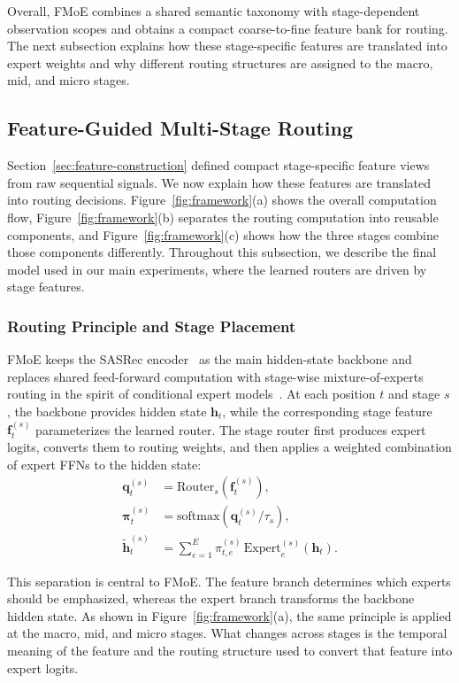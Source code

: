 \documentclass[sigconf,anonymous,review]{acmart}
\begin{document}
Overall, FMoE combines a shared semantic taxonomy with stage-dependent observation scopes and obtains a compact coarse-to-fine feature bank for routing. The next subsection explains how these stage-specific features are translated into expert weights and why different routing structures are assigned to the macro, mid, and micro stages.

\subsection{Feature-Guided Multi-Stage Routing}

Section~\ref{sec:feature-construction} defined compact stage-specific feature views from raw sequential signals. We now explain how these features are translated into routing decisions. Figure~\ref{fig:framework}(a) shows the overall computation flow, Figure~\ref{fig:framework}(b) separates the routing computation into reusable components, and Figure~\ref{fig:framework}(c) shows how the three stages combine those components differently. Throughout this subsection, we describe the final model used in our main experiments, where the learned routers are driven by stage features.

\subsubsection{Routing Principle and Stage Placement}

FMoE keeps the SASRec encoder~\cite{kang2018sasrec} as the main hidden-state backbone and replaces shared feed-forward computation with stage-wise mixture-of-experts routing in the spirit of conditional expert models~\cite{shazeer2017moe,fedus2022switch}. At each position $t$ and stage $s$, the backbone provides hidden state $\mathbf{h}_t$, while the corresponding stage feature $\mathbf{f}^{(s)}_t$ parameterizes the learned router. The stage router first produces expert logits, converts them to routing weights, and then applies a weighted combination of expert FFNs to the hidden state:
\begin{align}
\mathbf{q}^{(s)}_t &= \mathrm{Router}_s(\mathbf{f}^{(s)}_t), \\
\boldsymbol{\pi}^{(s)}_t &= \mathrm{softmax}\!\left(\mathbf{q}^{(s)}_t / \tau_s\right), \\
\tilde{\mathbf{h}}^{(s)}_t &= \sum_{e=1}^{E} \pi^{(s)}_{t,e}\,\mathrm{Expert}^{(s)}_e(\mathbf{h}_t).
\end{align}

This separation is central to FMoE. The feature branch determines which experts should be emphasized, whereas the expert branch transforms the backbone hidden state. As shown in Figure~\ref{fig:framework}(a), the same principle is applied at the macro, mid, and micro stages. What changes across stages is the temporal meaning of the feature and the routing structure used to convert that feature into expert logits.
\end{document}
